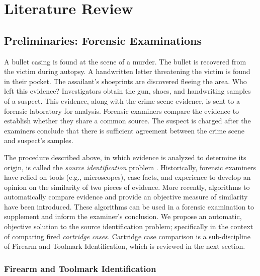 \documentclass[11pt,]{isuthesis}
\begin{document}
\newpage
{}

\setlength\parindent{24pt}

\hypertarget{literature-review}{%
\chapter{Literature Review}\label{literature-review}}

\hypertarget{preliminaries-forensic-examinations}{%
\section{Preliminaries: Forensic Examinations}\label{preliminaries-forensic-examinations}}

A bullet casing is found at the scene of a murder.
The bullet is recovered from the victim during autopsy.
A handwritten letter threatening the victim is found in their pocket.
The assailant's shoeprints are discovered fleeing the area.
Who left this evidence?
Investigators obtain the gun, shoes, and handwriting samples of a suspect.
This evidence, along with the crime scene evidence, is sent to a forensic laboratory for analysis.
Forensic examiners compare the evidence to establish whether they share a common source.
The suspect is charged after the examiners conclude that there is sufficient agreement between the crime scene and suspect's samples.

The procedure described above, in which evidence is analyzed to determine its origin, is called the \emph{source identification} problem \citep{Ommen2018}.
Historically, forensic examiners have relied on tools (e.g., microscopes), case facts, and experience to develop an opinion on the similarity of two pieces of evidence.
More recently, algorithms to automatically compare evidence and provide an objective measure of similarity have been introduced.
These algorithms can be used in a forensic examination to supplement and inform the examiner's conclusion.
We propose an automatic, objective solution to the source identification problem; specifically in the context of comparing fired \emph{cartridge cases.}
Cartridge case comparison is a sub-discipline of Firearm and Toolmark Identification, which is reviewed in the next section.

\hypertarget{firearm-and-toolmark-identification}{%
\subsection{Firearm and Toolmark Identification}\label{firearm-and-toolmark-identification}}
\end{document}
